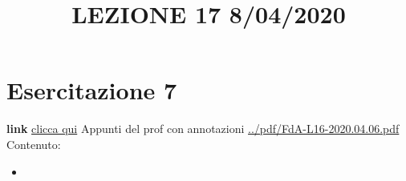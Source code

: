 \section{Esercitazione 7}
\title{LEZIONE 17 8/04/2020}\newline
\textbf{link} \href{}{clicca qui}\newline
\newline
Appunti del prof con annotazioni \url{../pdf/FdA-L16-2020.04.06.pdf}\newline
Contenuto:
\begin{itemize}
    \item 
\end{itemize}